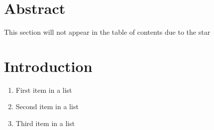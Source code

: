 \documentclass[10pt,a4paper,oneside,twoside]{scrartcl}
\begin{document}
	\section{Abstract}

	This section will not appear in the table of contents due to the star

	\section{Introduction}

	\begin{enumerate}[noitemsep] %
		\item First item in a list
		\item Second item in a list
		\item Third item in a list
	\end{enumerate}
\end{document}
